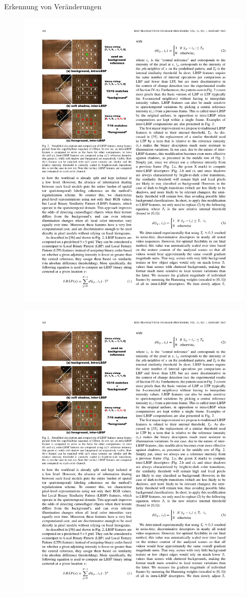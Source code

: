 \documentclass[hyperref={pdfpagelabels=false}]{beamer}
\begin{document}
\begin{frame}[t]{Erkennung von Veränderungen}
	\begin{figure}[]
		\centering
		\includegraphics[width=0.55\linewidth]{bilder/change_detection1.pdf}
		
		\includegraphics[width=0.55\linewidth]{bilder/change_detection2.pdf}
		\label{fig:einstieg}
	\end{figure}

\end{frame}
\end{document}
